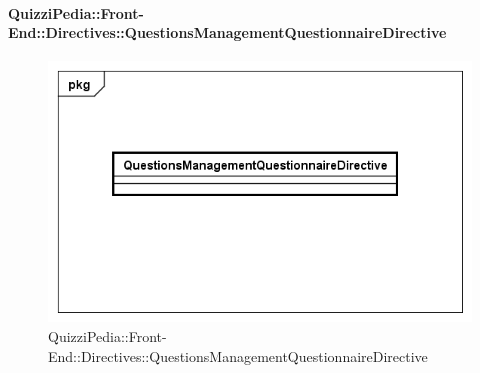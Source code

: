 \paragraph{QuizziPedia::Front-End::Directives::QuestionsManagementQuestionnaireDirective}

\label{QuizziPedia::Front-End::Directives::QuestionsManagementQuestionnaireDirective}

\begin{figure}[ht]
	\centering
	\includegraphics[scale=0.5,keepaspectratio]{UML/Classi/Front-End/QuizziPedia_Front-end_Directives_QuestionsManagementQuestionnaireDirective.png}
	\caption{QuizziPedia::Front-End::Directives::QuestionsManagementQuestionnaireDirective}
\end{figure} \FloatBarrier

